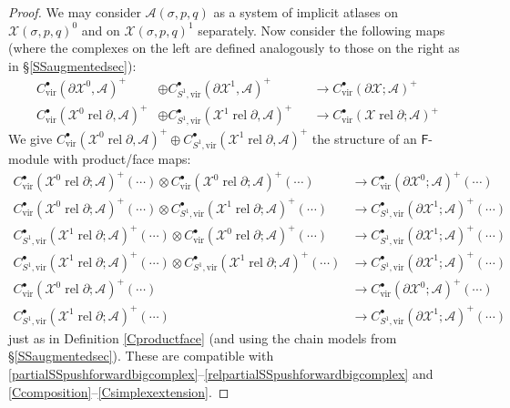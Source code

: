 \documentclass[12pt]{article}
\theoremstyle{definition}
\theoremstyle{remark}
\numberwithin{equation}{subsection}
\newcommand{\X}{\mathcal X}
\newcommand{\A}{\mathcal A}
\newcommand{\sF}{\mathsf{F}}
\newcommand{\vir}{\mathrm{vir}}
\newcommand{\rel}{\operatorname{rel}}
\begin{document}
\begin{proof}
We may consider $\A(\sigma,p,q)$ as a system of implicit atlases on $\X(\sigma,p,q)^0$ and on $\X(\sigma,p,q)^1$ separately.  Now consider the following maps (where the complexes on the left are defined analogously to those on the right as in \S\ref{SSaugmentedsec}):
\begin{align}
\label{partialSSpushforwardbigcomplex}C^\bullet_\vir(\partial\X^0,\A)^+&\oplus C^\bullet_{S^1,\vir}(\partial\X^1,\A)^+&&\to C^\bullet_\vir(\partial\X;\A)^+\\
\label{relpartialSSpushforwardbigcomplex}C^\bullet_\vir(\X^0\rel\partial,\A)^+&\oplus C^\bullet_{S^1,\vir}(\X^1\rel\partial,\A)^+&&\to C^\bullet_\vir(\X\rel\partial;\A)^+
\end{align}
We give $C^\bullet_\vir(\X^0\rel\partial,\A)^+\oplus C^\bullet_{S^1,\vir}(\X^1\rel\partial,\A)^+$ the structure of an $\sF$-module with product/face maps:
\begin{align}
\label{CSSproductfacesplitfirst}C^\bullet_\vir(\X^0\rel\partial;\A)^+(\cdots)\otimes C^\bullet_\vir(\X^0\rel\partial;\A)^+(\cdots)&\to C^\bullet_\vir(\partial\X^0;\A)^+(\cdots)\\
C^\bullet_\vir(\X^0\rel\partial;\A)^+(\cdots)\otimes C^\bullet_{S^1,\vir}(\X^1\rel\partial;\A)^+(\cdots)&\to C^\bullet_{S^1,\vir}(\partial\X^1;\A)^+(\cdots)\\
C^\bullet_{S^1,\vir}(\X^1\rel\partial;\A)^+(\cdots)\otimes C^\bullet_\vir(\X^0\rel\partial;\A)^+(\cdots)&\to C^\bullet_{S^1,\vir}(\partial\X^1;\A)^+(\cdots)\\
C^\bullet_{S^1,\vir}(\X^1\rel\partial;\A)^+(\cdots)\otimes C^\bullet_{S^1,\vir}(\X^1\rel\partial;\A)^+(\cdots)&\to C^\bullet_{S^1,\vir}(\partial\X^1;\A)^+(\cdots)\\
C^\bullet_\vir(\X^0\rel\partial;\A)^+(\cdots)&\to C^\bullet_\vir(\partial\X^0;\A)^+(\cdots)\\
\label{CSSproductfacesplitlast}C^\bullet_{S^1,\vir}(\X^1\rel\partial;\A)^+(\cdots)&\to C^\bullet_{S^1,\vir}(\partial\X^1;\A)^+(\cdots)
\end{align}
just as in Definition \ref{Cproductface} (and using the chain models from \S\ref{SSaugmentedsec}).  These are compatible with \eqref{partialSSpushforwardbigcomplex}--\eqref{relpartialSSpushforwardbigcomplex} and \eqref{Ccomposition}--\eqref{Csimplexextension}.


\end{proof}
\end{document}
